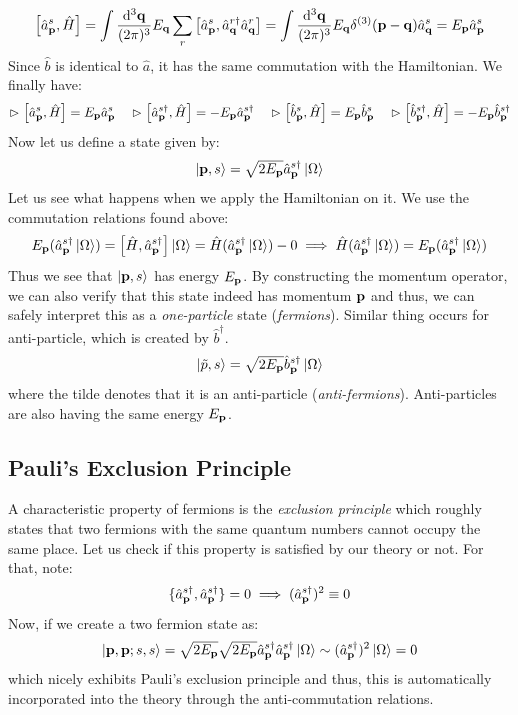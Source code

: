 \begin{align*}
   \left[ {\hat{a}_{\vb{p}}}^{s}, \hat{H} \right] = \int \frac{\dd^3\vb{{\vb{q}}}}{(2\pi)^3}E_{\vb{q}}\sum_{r} \left[ {\hat{a}_{\vb{p}}}^{s}, {\hat{a}_{\vb{q}}}^{r\dagger} {\hat{a}_{\vb{q}}}^{r} \right]= \int \frac{\dd^3\vb{{\vb{q}}}}{(2\pi)^3}E_{\vb{q}}\delta^{(3)}(\vb{p}-\vb{q}){\hat{a}_{\vb{q}}}^{s} = E_{\vb{p}} {\hat{a}_{\vb{p}}}^{s}
\end{align*}
Since $\hat{b}$ is identical to $\hat{a}$, it has the same commutation with the Hamiltonian. We finally have:
$$ \vartriangleright\left[ {\hat{a}_{\vb{p}}}^{s}, \hat{H} \right] = E_{\vb{p}} {\hat{a}_{\vb{p}}}^{s}\quad \vartriangleright \left[ {\hat{a}_{\vb{p}}}^{s\dagger}, \hat{H} \right]=-E_{\vb{p}} {\hat{a}_{\vb{p}}}^{s\dagger}\quad \vartriangleright\left[ {\hat{b}_{\vb{p}}}^{s}, \hat{H} \right] = E_{\vb{p}} {\hat{b}_{\vb{p}}}^{s}\quad \vartriangleright \left[ {\hat{b}_{\vb{p}}}^{s\dagger}, \hat{H} \right]=-E_{\vb{p}} {\hat{b}_{\vb{p}}}^{s\dagger}$$
Now let us define a state given by:
$$\ket{\vb{p},s} = \sqrt{2E_{\vb{p}}}{\hat{a}_{\vb{p}}}^{s\dagger}\ket{\Omega}$$
Let us see what happens when we apply the Hamiltonian on it. We use the commutation relations found above:
\begin{align*}
   E_{\vb{p}}( {\hat{a}_{\vb{p}}}^{s\dagger}\ket{\Omega}) =\left[ \hat{H}, {\hat{a}_{\vb{p}}}^{s\dagger} \right]\ket{\Omega} = \hat{H}({\hat{a}_{\vb{p}}}^{s\dagger} \ket{\Omega}) - 0 \implies \hat{H}({\hat{a}_{\vb{p}}}^{s\dagger} \ket{\Omega}) = E_{\vb{p}}( {\hat{a}_{\vb{p}}}^{s\dagger}\ket{\Omega})
\end{align*}
Thus we see that $\ket{\vb{p},s}$ has energy $E_{\vb{p}}$. By constructing the momentum operator, we can also verify that this state indeed has momentum $\vb{p}$ and thus, we can safely interpret this as a \textit{one-particle} state (\textit{fermions}). Similar thing occurs for anti-particle, which is created by $\hat{b}^\dagger$. 
$$\ket{\tilde{p}, s} = \sqrt{2E_{\vb{p}}}{\hat{b}_{\vb{p}}}^{s\dagger}\ket{\Omega}$$
where the tilde denotes that it is an anti-particle (\textit{anti-fermions}). Anti-particles are also having the same energy $E_{\vb{p}}$.
\subsection{Pauli's Exclusion Principle}
A characteristic property of fermions is the \textit{exclusion principle} which roughly states that two fermions with the same quantum numbers cannot occupy the same place. Let us check if this property is satisfied by our theory or not. For that, note:
$$\{{\hat{a}_{\vb{p}}}^{s\dagger}, {\hat{a}_{\vb{p}}}^{s\dagger}\} = 0 \implies ({\hat{a}_{\vb{p}}}^{s\dagger})^2 \equiv 0$$
Now, if we create a two fermion state as:
$$\ket{\vb{p}, \vb{p}; s,s} = \sqrt{2E_{\vb{p}}}\sqrt{2E_{\vb{p}}} {\hat{a}_{\vb{p}}}^{s\dagger} {\hat{a}_{\vb{p}}}^{s\dagger}\ket{\Omega} \sim ({\hat{a}_{\vb{p}}}^{s\dagger})^2\ket{\Omega} = 0$$
which nicely exhibits Pauli's exclusion principle and thus, this is automatically incorporated into the theory through the anti-commutation relations. 